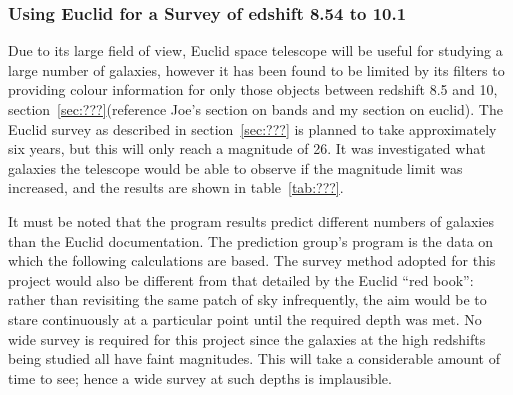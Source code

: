 
\subsubsection{Using Euclid for a Survey of edshift 8.54 to 10.1} %
\label{ssub:using_euclid_for_a_survey_of_edshift_8_54_to_10_1}
	Due to its large field of view, Euclid space telescope will be useful for studying a large number of galaxies, however it has been found to be limited by its filters to providing colour information for only those objects between redshift 8.5 and 10, section~\ref{sec:???}(reference Joe’s section on bands and my section on euclid). The Euclid survey as described in section~\ref{sec:???} is planned to take approximately six years, but this will only reach a magnitude of 26. It was investigated what galaxies the telescope would be able to observe if the magnitude limit was increased, and the results are shown in table~\ref{tab:???}.

	It must be noted that the program results predict different numbers of galaxies than the Euclid documentation. The prediction group's program is the data on which the following calculations are based. The survey method adopted for this project would also be different from that detailed by the Euclid ``red book'': rather than revisiting the same patch of sky infrequently, the aim would be to stare continuously at a particular point until the required depth was met. No wide survey is required for this project since the galaxies at the high redshifts being studied all have faint magnitudes. This will take a considerable amount of time to see; hence a wide survey at such depths is implausible.

